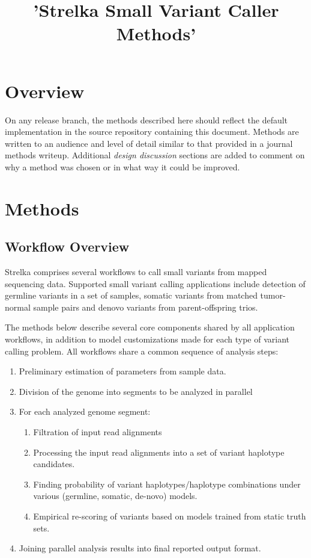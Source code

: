 \documentclass{article}
\title{'Strelka Small Variant Caller Methods'}
\begin{document}
\maketitle

\tableofcontents

\section{Overview}

On any release branch, the methods described here should reflect the default implementation in the source repository containing this document. Methods are written to an audience and level of detail similar to that provided in a journal methods writeup. Additional \emph{design discussion} sections are added to comment on why a method was chosen or in what way it could be improved.

\section{Methods}

\subsection{Workflow Overview}

Strelka comprises several workflows to call small variants from mapped sequencing data. Supported small variant calling applications include detection of germline variants in a set of samples, somatic variants from matched tumor-normal sample pairs and denovo variants from parent-offspring trios.

The methods below describe several core components shared by all application workflows, in addition to model customizations made for each type of variant calling problem. All workflows share a common sequence of analysis steps:

\begin{enumerate}
\item Preliminary estimation of parameters from sample data.
\item Division of the genome into segments to be analyzed in parallel
\item For each analyzed genome segment:
\begin{enumerate}
\item Filtration of input read alignments
\item Processing the input read alignments into a set of variant haplotype candidates.
\item Finding probability of variant haplotypes/haplotype combinations under various (germline, somatic, de-novo) models.
\item Empirical re-scoring of variants based on models trained from static truth sets.
\end{enumerate}
\item Joining parallel analysis results into final reported output format.
\end{enumerate}
\end{document}
